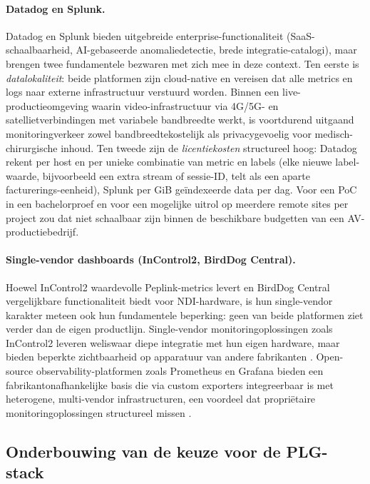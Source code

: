 \paragraph{Datadog en Splunk.} Datadog en Splunk bieden uitgebreide enterprise-functionaliteit (SaaS-schaalbaarheid, AI-gebaseerde anomaliedetectie, brede integratie-catalogi), maar brengen twee fundamentele bezwaren met zich mee in deze context. Ten eerste is \emph{datalokaliteit}: beide platformen zijn cloud-native en vereisen dat alle metrics en logs naar externe infrastructuur verstuurd worden. Binnen een live-productieomgeving waarin video-infrastructuur via 4G/5G- en satellietverbindingen met variabele bandbreedte werkt, is voortdurend uitgaand monitoringverkeer zowel bandbreedtekostelijk als privacygevoelig voor medisch-chirurgische inhoud. Ten tweede zijn de \emph{licentiekosten} structureel hoog: Datadog rekent per host en per unieke combinatie van metric en labels (elke nieuwe label-waarde, bijvoorbeeld een extra stream of sessie-ID, telt als een aparte facturerings-eenheid), Splunk per GiB geïndexeerde data per dag. Voor een PoC in een bachelorproef en voor een mogelijke uitrol op meerdere remote sites per project zou dat niet schaalbaar zijn binnen de beschikbare budgetten van een AV-productiebedrijf.

\paragraph{Single-vendor dashboards (InControl2, BirdDog Central).} Hoewel InControl2 waardevolle Peplink-metrics levert en BirdDog Central vergelijkbare functionaliteit biedt voor NDI-hardware, is hun single-vendor karakter meteen ook hun fundamentele beperking: geen van beide platformen ziet verder dan de eigen productlijn. Single-vendor monitoringoplossingen zoals InControl2 leveren weliswaar diepe integratie met hun eigen hardware, maar bieden beperkte zichtbaarheid op apparatuur van andere fabrikanten \autocite{Turnbull2018}. Open-source observability-platformen zoals Prometheus en Grafana bieden een fabrikantonafhankelijke basis die via custom exporters integreerbaar is met heterogene, multi-vendor infrastructuren, een voordeel dat propriëtaire monitoringoplossingen structureel missen \autocite{Ellsworth2025,Turnbull2018}.

\subsection{Onderbouwing van de keuze voor de PLG-stack}
\label{sec:tool-plg}

